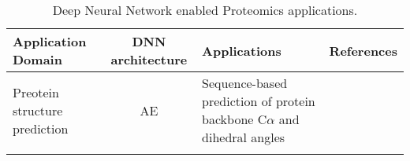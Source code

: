 \begin{table}[h!]
\centering
\begin{tabular}{|| l | c | l | l ||}
    \hline
    Application Domain & DNN architecture & Applications & References\\
    \hline \hline
    Preotein structure prediction & AE & Sequence-based prediction of protein backbone C$\alpha$ and dihedral angles & \\
    & 
    \hline
\end{tabular}
\caption{Deep Neural Network enabled Proteomics applications.}
\label{tab:PS-DNN}
\end{table}